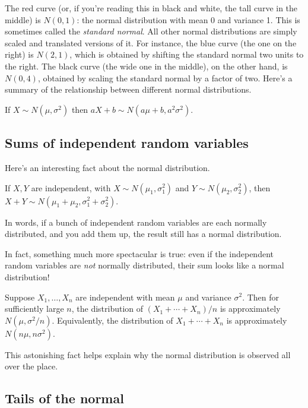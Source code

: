\noindent
The red curve (or, if you're reading this in black and white, the tall curve
in the middle) is $N(0,1)$: the normal distribution with mean 0 and
variance 1. This is sometimes called the {\it standard normal}. All other
normal distributions are simply scaled and translated versions of it. For
instance, the blue curve (the one on the right) is $N(2,1)$, which is obtained
by shifting the standard normal two units to the right. The black curve (the
wide one in the middle), on the other hand, is $N(0,4)$, obtained by scaling
the standard normal by a factor of two. Here's a summary of the relationship 
between different normal distributions.
\begin{fact}
If $X \sim N(\mu, \sigma^2)$ then $aX + b \sim N(a\mu + b, a^2 \sigma^2)$.
\end{fact}

\subsection{Sums of independent random variables}

Here's an interesting fact about the normal distribution.
\begin{fact}
If $X,Y$ are independent, with $X \sim N(\mu_1, \sigma_1^2)$ and 
$Y \sim N(\mu_2, \sigma_2^2)$, then $X + Y \sim N(\mu_1+\mu_2, \sigma_1^2+ \sigma_2^2)$.
\end{fact}
In words, if a bunch of independent random variables are each normally distributed, 
and you add them up, the result still has a normal distribution.

In fact, something much more spectacular is true: even if the independent random 
variables are {\it not} normally distributed, their sum looks like a normal 
distribution! 
\begin{fact}
Suppose $X_1, \ldots, X_n$ are independent with mean $\mu$ and variance $\sigma^2$.
Then for sufficiently large $n$, the distribution of $(X_1 + \cdots + X_n)/n$ is
approximately $N(\mu, \sigma^2/n)$. Equivalently, the distribution of 
$X_1 + \cdots + X_n$ is approximately $N(n \mu, n \sigma^2)$.
\end{fact}
This astonishing fact helps explain why the normal distribution is observed all
over the place.

\subsection{Tails of the normal}

